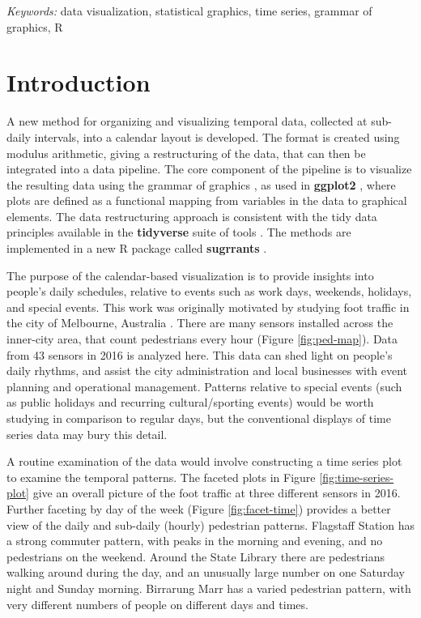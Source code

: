 \documentclass[12pt]{article}
\begin{document}
\noindent%
{\it Keywords:} data visualization, statistical graphics, time series, grammar of graphics, R
\vfill

\newpage
{} %

\hypertarget{introduction}{%
\section{Introduction}\label{introduction}}

A new method for organizing and visualizing temporal data, collected at sub-daily intervals, into a calendar layout is developed. The format is created using modulus arithmetic, giving a restructuring of the data, that can then be integrated into a data pipeline. The core component of the pipeline is to visualize the resulting data using the grammar of graphics \citep{wilkinson2006grammar, wickham2009ggplot2}, as used in \textbf{ggplot2} \citep{R-ggplot2}, where plots are defined as a functional mapping from variables in the data to graphical elements. The data restructuring approach is consistent with the tidy data principles available in the \textbf{tidyverse} suite of tools \citep{R-tidyverse}. The methods are implemented in a new R package called \textbf{sugrrants} \citep{R-sugrrants}.

The purpose of the calendar-based visualization is to provide insights into people's daily schedules, relative to events such as work days, weekends, holidays, and special events. This work was originally motivated by studying foot traffic in the city of Melbourne, Australia \citep{ped}. There are many sensors installed across the inner-city area, that count pedestrians every hour (Figure \ref{fig:ped-map}). Data from 43 sensors in 2016 is analyzed here. This data can shed light on people's daily rhythms, and assist the city administration and local businesses with event planning and operational management. Patterns relative to special events (such as public holidays and recurring cultural/sporting events) would be worth studying in comparison to regular days, but the conventional displays of time series data may bury this detail.

A routine examination of the data would involve constructing a time series plot to examine the temporal patterns. The faceted plots in Figure \ref{fig:time-series-plot} give an overall picture of the foot traffic at three different sensors in 2016. Further faceting by day of the week (Figure \ref{fig:facet-time}) provides a better view of the daily and sub-daily (hourly) pedestrian patterns. Flagstaff Station has a strong commuter pattern, with peaks in the morning and evening, and no pedestrians on the weekend. Around the State Library there are pedestrians walking around during the day, and an unusually large number on one Saturday night and Sunday morning. Birrarung Marr has a varied pedestrian pattern, with very different numbers of people on different days and times.
\end{document}

